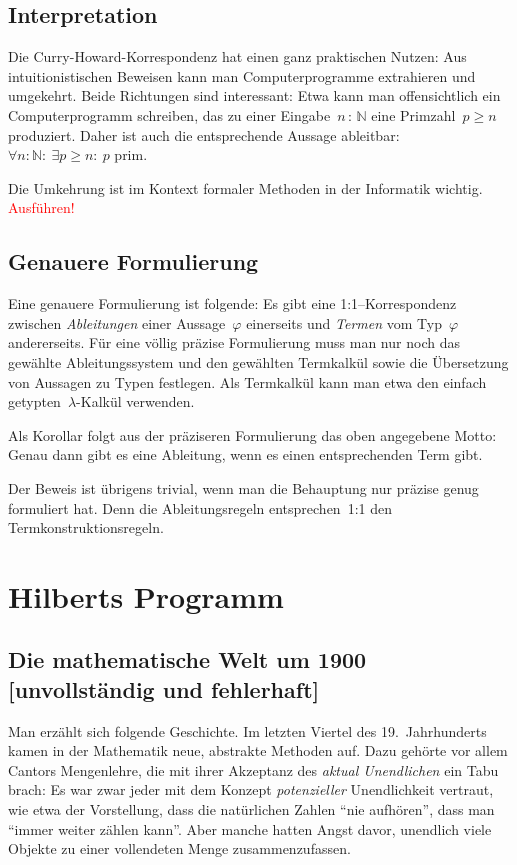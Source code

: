 \documentclass[a4paper,ngerman,12pt]{scrartcl}
\theoremstyle{definition}
\theoremstyle{plain}
\theoremstyle{remark}
\newcommand{\NN}{\mathbb{N}}
\renewcommand{\_}{\mathpunct{.}\,}
\newcommand{\?}{\,{:}\,}
\newcommand{\XXX}[1]{\textcolor{red}{#1}}
\begin{document}
\subsection{Interpretation}

Die Curry-Howard-Korrespondenz hat einen ganz praktischen Nutzen: Aus
intuitionistischen Beweisen kann man Computerprogramme extrahieren und
umgekehrt. Beide Richtungen sind interessant: Etwa kann man offensichtlich ein
Computerprogramm schreiben, das zu einer Eingabe~$n \? \NN$ eine Primzahl~$p
\geq n$ produziert. Daher ist auch die entsprechende Aussage ableitbar:~$\forall
n{:}\NN{:}\ \exists p \geq n{:}\ \text{$p$ prim}$.

Die Umkehrung ist im Kontext formaler Methoden in der Informatik wichtig.
\XXX{Ausführen!}


\subsection{Genauere Formulierung}

Eine genauere Formulierung ist folgende: Es gibt eine 1:1--Korrespondenz
zwischen \emph{Ableitungen} einer Aussage~$\varphi$ einerseits und
\emph{Termen} vom Typ~$\varphi$ andererseits. Für eine völlig präzise
Formulierung muss man nur noch das gewählte Ableitungssystem und den gewählten
Termkalkül sowie die
Übersetzung von Aussagen zu Typen festlegen. Als Termkalkül kann man etwa den
einfach getypten~$\lambda$-Kalkül verwenden.


Als Korollar folgt aus der präziseren Formulierung das oben angegebene Motto:
Genau dann gibt es eine Ableitung, wenn es einen entsprechenden Term gibt.

Der Beweis ist übrigens trivial, wenn man die Behauptung nur präzise genug
formuliert hat. Denn die Ableitungsregeln entsprechen~1:1 den
Termkonstruktionsregeln.


\section{Hilberts Programm}

\subsection[Die mathematische Welt um 1900]{Die mathematische Welt um 1900
\qquad\small[unvollständig und fehlerhaft]}

Man erzählt sich folgende Geschichte. Im letzten Viertel des 19.~Jahrhunderts
kamen in der Mathematik neue, abstrakte Methoden auf. Dazu gehörte vor allem
Cantors Mengenlehre, die mit ihrer Akzeptanz des \emph{aktual Unendlichen} ein
Tabu brach: Es war zwar jeder mit dem Konzept \emph{potenzieller} Unendlichkeit
vertraut, wie etwa der Vorstellung, dass die natürlichen Zahlen "`nie
aufhören"', dass man "`immer weiter zählen kann"'. Aber manche hatten Angst
davor, unendlich viele Objekte zu einer vollendeten Menge zusammenzufassen.
\end{document}
